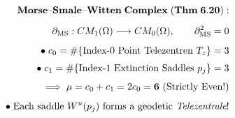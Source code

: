 \documentclass[preview]{standalone}
\begin{document}
\begin{align*}
\special{dvisvgm:raw <g id='unique000'>}\mathbf{Morse\text{--}Smale\text{--}Witten\;Complex\;(Thm\;6.20):}\\[5pt]\partial_{\text{MS}}: CM_1(\Omega) \longrightarrow CM_0(\Omega), \qquad \partial_{\text{MS}}^2 = 0\\[5pt]\bullet\;c_0 = \#\{\text{Index-0 Point Telezentren }T_z\} = 3\\[3pt]\bullet\;c_1 = \#\{\text{Index-1 Extinction Saddles }p_j\} = 3\\[4pt]\implies \mu = c_0 + c_1 = 2c_0 = \mathbf{6\text{ (Strictly Even!)}}\\[5pt]\bullet\;\text{Each saddle }W^u(p_j)\text{ forms a geodetic }\textit{Telezentrale}!\special{dvisvgm:raw </g>}
\end{align*}
\end{document}
